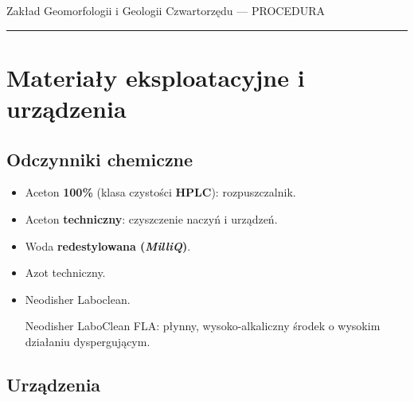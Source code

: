 \documentclass[
  letterpaper,
  DIV=11,
  numbers=noendperiod]{scrreprt}
\begin{document}
Zakład Geomorfologii i Geologii Czwartorzędu --- PROCEDURA

\begin{center}\rule{0.5\linewidth}{0.5pt}\end{center}

\hypertarget{materiaux142y-eksploatacyjne-i-urzux105dzenia-2}{%
\section{Materiały eksploatacyjne i
urządzenia}\label{materiaux142y-eksploatacyjne-i-urzux105dzenia-2}}

\hypertarget{odczynniki-chemiczne-2}{%
\subsection{Odczynniki chemiczne}\label{odczynniki-chemiczne-2}}

\begin{itemize}
\item
  Aceton \textbf{100\%} (klasa czystości \textbf{HPLC}): rozpuszczalnik.
\item
  Aceton \textbf{techniczny}: czyszczenie naczyń i urządzeń.
\item
  Woda \textbf{redestylowana (\emph{MilliQ})}.
\item
  Azot techniczny.
\item
  Neodisher Laboclean.

  Neodisher LaboClean FLA: płynny, wysoko-alkaliczny środek o wysokim
  działaniu dyspergującym.
\end{itemize}

\hypertarget{urzux105dzenia-2}{%
\subsection{Urządzenia}\label{urzux105dzenia-2}}
\end{document}
